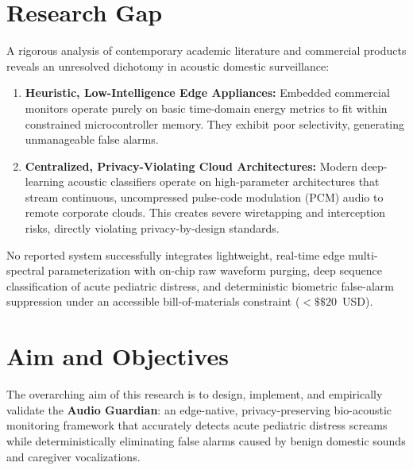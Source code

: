 \documentclass[12pt, a4paper]{report}
\begin{document}
\section{Research Gap}
A rigorous analysis of contemporary academic literature and commercial products reveals an unresolved dichotomy in acoustic domestic surveillance:
\begin{enumerate}
    \item \textbf{Heuristic, Low-Intelligence Edge Appliances:} Embedded commercial monitors operate purely on basic time-domain energy metrics to fit within constrained microcontroller memory. They exhibit poor selectivity, generating unmanageable false alarms.
    \item \textbf{Centralized, Privacy-Violating Cloud Architectures:} Modern deep-learning acoustic classifiers operate on high-parameter architectures that stream continuous, uncompressed pulse-code modulation (PCM) audio to remote corporate clouds. This creates severe wiretapping and interception risks, directly violating privacy-by-design standards.
\end{enumerate}
No reported system successfully integrates lightweight, real-time edge multi-spectral parameterization with on-chip raw waveform purging, deep sequence classification of acute pediatric distress, and deterministic biometric false-alarm suppression under an accessible bill-of-materials constraint ($<\$\$20$~USD).

\section{Aim and Objectives}
The overarching aim of this research is to design, implement, and empirically validate the \textbf{Audio Guardian}: an edge-native, privacy-preserving bio-acoustic monitoring framework that accurately detects acute pediatric distress screams while deterministically eliminating false alarms caused by benign domestic sounds and caregiver vocalizations.
\end{document}
